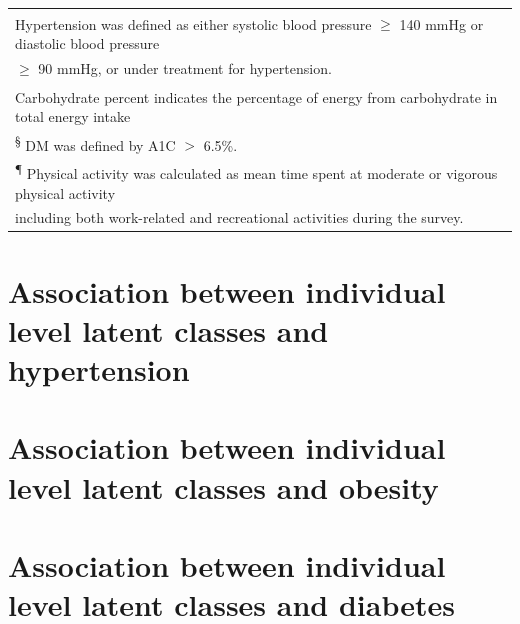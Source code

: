 \begin{table}[H]
\begin{tabular}[t]{lcccc}
		\multicolumn{5}{l}{\textsuperscript{\dag} Hypertension was defined as either systolic blood pressure $\geqslant$ 140 mmHg or diastolic blood pressure }\\
		\multicolumn{5}{l}{$\geqslant$ 90 mmHg, or under treatment for hypertension.}\\
		\multicolumn{5}{l}{\textsuperscript{\ddag} Carbohydrate percent indicates the percentage of energy from carbohydrate in total energy intake}\\  
		\multicolumn{5}{l}{\textsuperscript{\S} DM was defined by A1C $>$ 6.5\%.}\\
		\multicolumn{5}{l}{\textsuperscript{\P} Physical activity was calculated as mean time spent at moderate or vigorous physical activity}\\
		\multicolumn{5}{l}{including both work-related and recreational activities during the survey.}\\
	\end{tabular}
\end{table}



\section{Association between individual level latent classes and hypertension}





\section{Association between individual level latent classes and obesity}



\section{Association between individual level latent classes and diabetes}